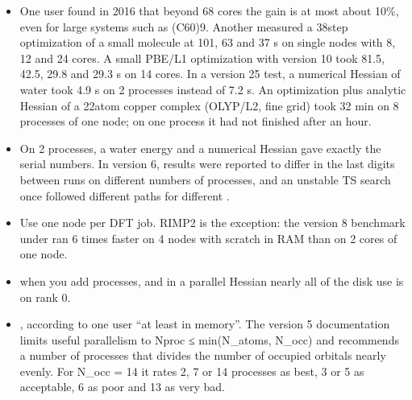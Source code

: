 \documentclass[letterpaper,10pt,english,openany,oneside]{sphinxmanual}
\begin{document}
\begin{itemize}
\item {} 
\sphinxAtStartPar
{} One user found in 2016 that beyond 6\textendash{}8 cores the gain
is at most about 10\%, even for large systems such as (C60)9. Another measured a 38\sphinxhyphen{}step optimization of a small
molecule at 101, 63 and 37 s on single nodes with 8, 12 and 24 cores. A small PBE/L1 optimization with version 10
took 81.5, 42.5, 29.8 and 29.3 s on 1\textendash{}4 cores. In a version 25 test, a numerical  Hessian of water took
4.9 s on 2 processes instead of 7.2 s. An optimization plus analytic Hessian of a 22\sphinxhyphen{}atom copper complex
(OLYP/L2, fine grid) took 32 min on 8 processes of one node; on one process it had not finished after an hour.



\item {} 
\sphinxAtStartPar
{} On 2 processes, a water energy and a numerical
 Hessian gave exactly the serial numbers. In version 6, results were reported to differ in the last digits
between runs on different numbers of processes, and an unstable TS search once followed different paths for
different .



\item {} 
\sphinxAtStartPar
{} Use one node per DFT job. RI\sphinxhyphen{}MP2 is the exception: the version 8
benchmark under {\hyperref[\detokenize{start/running:running-ram-disk}]{}} ran 6 times faster on 4 nodes with scratch in RAM than on 2 cores of one node.



\item {} 
\sphinxAtStartPar
{} when you add processes, and in a parallel Hessian nearly all of the disk use is
on rank 0.



\item {} 
\sphinxAtStartPar
{}, according to one user “at least in memory”. The version 5 documentation limits useful
parallelism to Nproc ≤ min(N\_atoms, N\_occ) and recommends a number of processes that divides the number of occupied orbitals
nearly evenly. For N\_occ = 14 it rates 2, 7 or 14 processes as best, 3 or 5 as acceptable, 6 as poor and 13 as very
bad.




\end{itemize}
\end{document}
